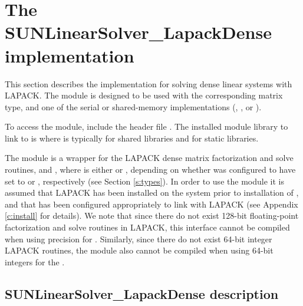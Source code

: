 \section{The SUNLinearSolver\_LapackDense implementation}
\label{ss:sunlinsol_lapdense}

This section describes the {\sunlinsol} implementation for solving dense linear
systems with LAPACK. The {\sunlinsollapdense} module is designed to be used with the
corresponding {\sunmatdense} matrix type, and one of the serial or
shared-memory {\nvector} implementations ({\nvecs}, {\nvecopenmp}, or
{\nvecpthreads}).

To access the {\sunlinsollapdense} module, include the header file \newline
{}. The installed module library to link
to is \newline
{} where 
is typically  for shared libraries and  for static libraries.

The {\sunlinsollapdense} module is a {\sunlinsol} wrapper for
the LAPACK dense matrix factorization and solve routines, 
and , where \id{*} is either  or , depending on
whether {\sundials} was configured to have  set to
 or , respectively (see Section \ref{s:types}).
In order to use the {\sunlinsollapdense} module it is assumed
that LAPACK has been installed on the system prior to installation of
{\sundials}, and that {\sundials} has been configured appropriately to
link with LAPACK (see Appendix \ref{c:install} for details).
We note that since there do not exist 128-bit floating-point
factorization and solve routines in LAPACK, this interface cannot be
compiled when using  precision for .
Similarly, since there do not exist 64-bit integer LAPACK routines,
the {\sunlinsollapdense} module also cannot be compiled when using
64-bit integers for the . {\warn}


\subsection{SUNLinearSolver\_LapackDense description}
\label{ss:sunlinsol_lapdense_description}

